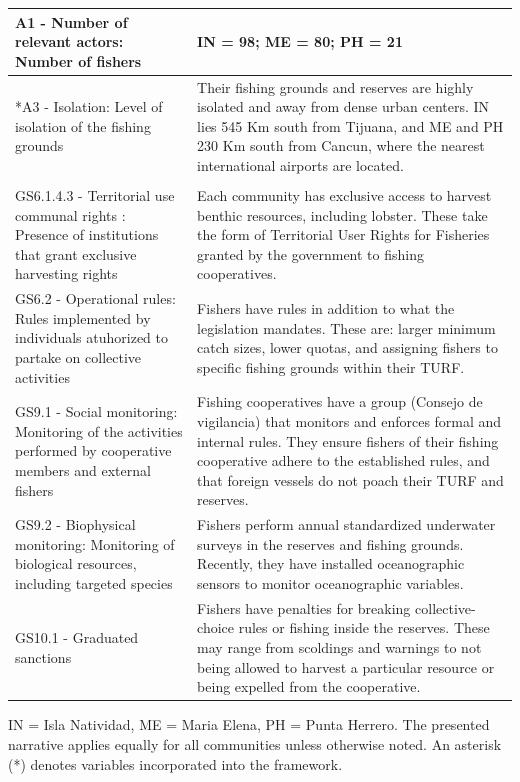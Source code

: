 \documentclass[10pt,letterpaper]{article}
\begin{document}
\begin{table}[!ht]
{\begin{tabular}{>{\raggedright\arraybackslash}p{6.5cm}|>{\raggedright\arraybackslash}p{12.2cm}}
\hline
\hspace{1em}A1 - Number of relevant actors: Number of fishers & IN = 98; ME = 80; PH = 21\\
\hline
\hspace{1em}*A3 - Isolation: Level of isolation of the fishing grounds & Their fishing grounds and reserves are highly isolated and away from dense urban centers. IN lies 545 Km south from Tijuana, and ME and PH 230 Km south from Cancun, where the nearest international airports are located.\\
\hline
\multicolumn{2}{l}{\textbf{Governance system (G)}}\\
\hline
\hspace{1em}GS6.1.4.3 - Territorial use communal rights : Presence of institutions that grant exclusive harvesting rights & Each community has exclusive access to harvest benthic resources, including lobster. These take the form of Territorial User Rights for Fisheries granted by the government to fishing cooperatives.\\
\hline
\hspace{1em}GS6.2 - Operational rules: Rules implemented by individuals atuhorized to partake on collective activities & Fishers have rules in addition to what the legislation mandates. These are: larger minimum catch sizes, lower quotas, and assigning fishers to specific fishing grounds within their TURF.\\
\hline
\hspace{1em}GS9.1 - Social monitoring: Monitoring of the activities performed by cooperative members and external fishers & Fishing cooperatives have a group (Consejo de vigilancia) that monitors and enforces formal and internal rules. They ensure fishers of their fishing cooperative adhere to the established rules, and that foreign vessels do not poach their TURF and reserves.\\
\hline
\hspace{1em}GS9.2 - Biophysical monitoring: Monitoring of biological resources, including targeted species & Fishers perform annual standardized underwater surveys in the reserves and fishing grounds. Recently, they have installed oceanographic sensors to monitor oceanographic variables.\\
\hline
GS10.1 - Graduated sanctions & Fishers have penalties for breaking collective-choice rules or fishing inside the reserves. These may range from scoldings and warnings to not being allowed to harvest a particular resource or being expelled from the cooperative.\\
\hline
\end{tabular}}
\label{table:ses}
IN = Isla Natividad, ME = Maria Elena, PH = Punta Herrero. The presented narrative applies equally for all communities unless otherwise noted. An asterisk (*) denotes variables incorporated into the framework.
\end{table}
\end{document}
